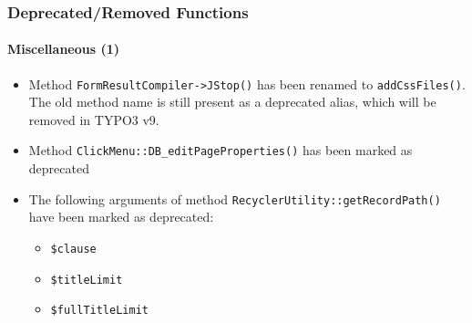 \begin{frame}[fragile]
	\frametitle{Deprecated/Removed Functions}
	\framesubtitle{Miscellaneous (1)}

	\begin{itemize}
		\item Method \texttt{FormResultCompiler->JStop()} has been renamed to \texttt{addCssFiles()}.
			The old method name is still present as a deprecated alias, which will be removed in TYPO3 v9.

		\item Method \texttt{ClickMenu::DB\_editPageProperties()} has been marked as deprecated

		\item The following arguments of method \texttt{RecyclerUtility::getRecordPath()} have been marked as deprecated:

			\begin{itemize}
				\item \texttt{\$clause}
				\item \texttt{\$titleLimit}
				\item \texttt{\$fullTitleLimit}
			\end{itemize}

	\end{itemize}

\end{frame}


